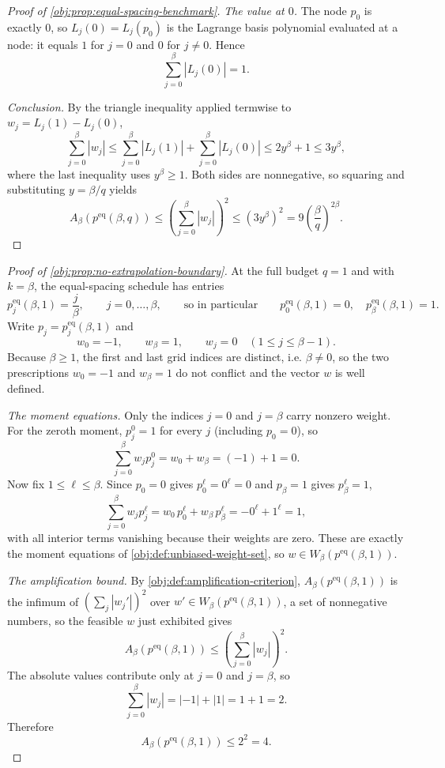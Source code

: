 \documentclass[11pt]{article}
\begin{document}
\begin{proof}[Proof of \cref{obj:prop:equal-spacing-benchmark}]
\emph{The value at \(0\).}
The node \(p_0\) is exactly \(0\), so \(L_j(0)=L_j(p_0)\) is the Lagrange basis polynomial evaluated at a node: it equals \(1\) for \(j=0\) and \(0\) for \(j\ne0\). Hence
\[
\sum_{j=0}^{\beta}|L_j(0)|=1.
\] %

\emph{Conclusion.}
By the triangle inequality applied termwise to \(w_j=L_j(1)-L_j(0)\),
\[
\sum_{j=0}^{\beta}|w_j|
\le
\sum_{j=0}^{\beta}|L_j(1)|+\sum_{j=0}^{\beta}|L_j(0)|
\le
2y^\beta+1
\le
3y^\beta,
\]
where the last inequality uses \(y^\beta\ge1\). %
Both sides are nonnegative, so squaring and substituting \(y=\beta/q\) yields
\[
A_\beta\!\left(p^{\mathrm{eq}}(\beta,q)\right)
\le
\left(\sum_{j=0}^{\beta}|w_j|\right)^2
\le
(3y^\beta)^2
=
9\left(\frac{\beta}{q}\right)^{2\beta}.
\] %
\end{proof}

\begin{proof}[Proof of \cref{obj:prop:no-extrapolation-boundary}]
At the full budget \(q=1\) and with \(k=\beta\), the equal-spacing schedule has entries
\[
p^{\mathrm{eq}}_j(\beta,1)=\frac{j}{\beta},
\qquad j=0,\ldots,\beta,
\qquad\text{so in particular}\qquad
p^{\mathrm{eq}}_0(\beta,1)=0,
\quad
p^{\mathrm{eq}}_\beta(\beta,1)=1 .
\]
Write \(p_j=p^{\mathrm{eq}}_j(\beta,1)\) and
\[
w_0=-1,\qquad w_\beta=1,\qquad w_j=0\quad(1\le j\le\beta-1).
\]
Because \(\beta\ge1\), the first and last grid indices are distinct, i.e. \(\beta\ne0\), so the two prescriptions \(w_0=-1\) and \(w_\beta=1\) do not conflict and the vector \(w\) is well defined. %

\emph{The moment equations.}
Only the indices \(j=0\) and \(j=\beta\) carry nonzero weight. For the zeroth moment, \(p_j^0=1\) for every \(j\) (including \(p_0=0\)), so
\[
\sum_{j=0}^{\beta}w_j p_j^0
=
w_0+w_\beta
=
(-1)+1
=
0.
\] %
Now fix \(1\le\ell\le\beta\). Since \(p_0=0\) gives \(p_0^\ell=0^\ell=0\) and \(p_\beta=1\) gives \(p_\beta^\ell=1\),
\[
\sum_{j=0}^{\beta}w_j p_j^\ell
=
w_0\,p_0^\ell+w_\beta\,p_\beta^\ell
=
-0^\ell+1^\ell
=
1,
\]
with all interior terms vanishing because their weights are zero. These are exactly the moment equations of \cref{obj:def:unbiased-weight-set}, so \(w\in W_\beta(p^{\mathrm{eq}}(\beta,1))\). %

\emph{The amplification bound.}
By \cref{obj:def:amplification-criterion}, \(A_\beta(p^{\mathrm{eq}}(\beta,1))\) is the infimum of \(\left(\sum_j|w_j'|\right)^2\) over \(w'\in W_\beta(p^{\mathrm{eq}}(\beta,1))\), a set of nonnegative numbers, so the feasible \(w\) just exhibited gives
\[
A_\beta\!\left(p^{\mathrm{eq}}(\beta,1)\right)
\le
\left(\sum_{j=0}^{\beta}|w_j|\right)^2.
\] %
The absolute values contribute only at \(j=0\) and \(j=\beta\), so
\[
\sum_{j=0}^{\beta}|w_j|=|-1|+|1|=1+1=2.
\] %
Therefore
\[
A_\beta\!\left(p^{\mathrm{eq}}(\beta,1)\right)\le 2^2=4.
\] %
\end{proof}
\end{document}
